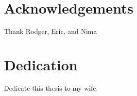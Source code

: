 \documentclass[msc,oneside]{ubcthesis}
\begin{document}
\tableofcontents                %
\listoftables                   %
\listoffigures                  %

\chapter{Acknowledgements}      %
Thank Rodger, Eric, and Nima

\chapter{Dedication} %
Dedicate this thesis to my wife.


\mainmatter

%	
%
%



%
%
\end{document}
